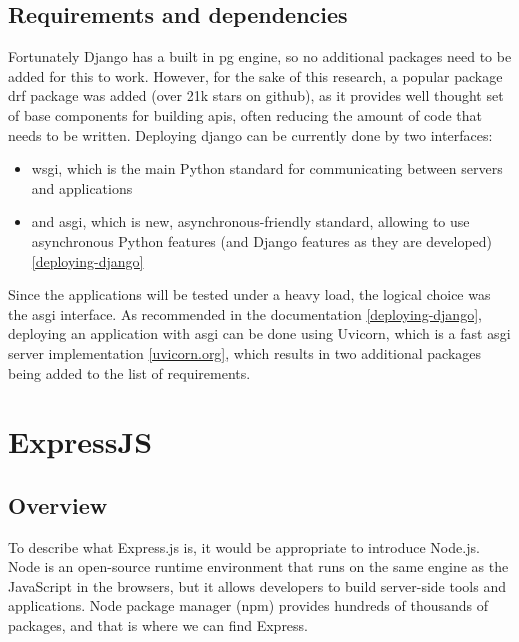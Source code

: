 \subsection{Requirements and dependencies}
Fortunately Django has a built in \acrlong{pg} engine, so no additional packages need to be added for this to work. However, for the sake of this research, a popular package \acrlong{drf} package was added (over 21k stars on github), as it provides well thought set of base components for building \acrshort{api}s, often reducing the amount of code that needs to be written.
Deploying django can be currently done by two interfaces:
\begin{itemize}
    \item \acrshort{wsgi}, which is the main Python standard for communicating between servers and applications
    \item and \acrshort{asgi}, which is new, asynchronous-friendly standard, allowing to use asynchronous Python features (and Django features as they are developed) \ref{deploying-django}
\end{itemize}

Since the applications will be tested under a heavy load, the logical choice was the \acrshort{asgi} interface. As recommended in the documentation \ref{deploying-django}, deploying an application with \acrshort{asgi} can be done using Uvicorn, which is a fast \acrshort{asgi} server implementation \ref{uvicorn.org}, which results in two additional packages being added to the list of requirements.

\section{ExpressJS}

\subsection{Overview}

To describe what Express.js is, it would be appropriate to introduce Node.js. Node is an open-source runtime environment that runs on the same engine as the JavaScript in the browsers, but it allows developers to build server-side tools and applications. Node package manager (\acrshort{npm}) provides hundreds of thousands of packages, and that is where we can find Express. %

